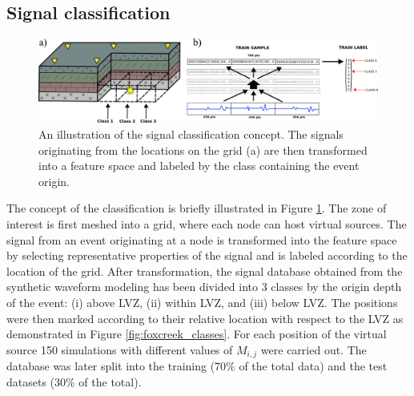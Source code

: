 \subsection{Signal classification}
\begin{figure}[htb]
\begin{center}
\includegraphics[width=0.85\linewidth,angle=0]{./AntonBiryukov_bibtex/classes.png}
\end{center}
\vspace{-4mm}
\caption{An illustration of the signal classification concept. The signals originating from the locations on the grid (a) are then transformed into a feature space and labeled by the class containing the event origin.}
\label{fig:classes}
\end{figure}
The concept of the classification is briefly illustrated in Figure \ref{fig:classes}. The zone of interest is first meshed into a grid, where each node can host virtual sources. The signal from an event originating at a node is transformed into the feature space by selecting representative properties of the signal and is labeled according to the location of the grid. After transformation, the signal database obtained from the synthetic waveform modeling has been divided into 3 classes by the origin depth of the event: (i) above LVZ, (ii) within LVZ, and (iii) below LVZ. The positions were then marked according to their relative location with respect to the LVZ as demonstrated in Figure \ref{fig:foxcreek_classes}. For each position of the virtual source 150 simulations with different values of $M_{i,j}$ were carried out. The database was later split into the training (70\% of the total data) and the test datasets (30\% of the total). 

